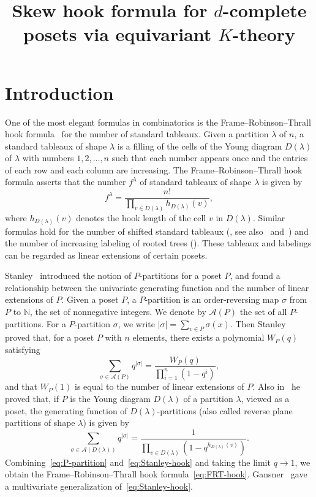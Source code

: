 \documentclass[ALCO,ThmDefs,Unicode,epreuves]{cedram}
\author{\firstname{Hiroshi} \lastname{Naruse}} %
\author{\firstname{Soichi} \lastname{Okada}} %
\title[Skew hook formula for $d$-complete posets via equivariant $K$-theory]{Skew hook formula for $d$-complete posets via equivariant $K$-theory}
\newcommand\Nat{\mathbb{N}}
\newcommand\AP{\mathcal{A}}
\begin{document}
\maketitle

\section{%
Introduction
}

One of the most elegant formulas in combinatorics is the Frame--Robinson--Thrall hook formula~\cite[Theorem~1]{FRT} for the number of standard tableaux.
Given a partition $\lambda$ of $n$, 
a standard tableaux of shape $\lambda$ is a filling of the cells of 
the Young diagram $D(\lambda)$ of $\lambda$ with numbers $1, 2, \dots, n$ 
such that each number appears once and the entries of each row and each column are increasing.
The Frame--Robinson--Thrall hook formula asserts that the number $f^\lambda$ of 
standard tableaux of shape $\lambda$ is given by
\begin{equation}
\label{eq:FRT-hook}
f^\lambda
 =
\frac{ n! }
 { \prod_{v \in D(\lambda)} h_{D(\lambda)}(v) },
\end{equation}
where $h_{D(\lambda)}(v)$ denotes the hook length of the cell $v$ in $D(\lambda)$.
Similar formulas hold for the number of shifted standard tableaux 
(\cite[5.1.4, Exercise~21]{Knu}, see also~\cite[\S~40]{Schur} and~\cite[Theorem~1]{T}) 
and the number of increasing labeling of rooted trees (\cite[5.1.4, Exercise~20]{Knu}).
These tableaux and labelings can be regarded as linear extensions of certain posets.

Stanley~\cite{Stan1} introduced the notion of $P$-partitions for a poset $P$, 
and found a relationship between the univariate generating function 
and the number of linear extensions of $P$.
Given a poset $P$, a $P$-partition is an order-reversing map $\sigma$ from $P$ to $\Nat$, 
the set of nonnegative integers.
We denote by $\AP(P)$ the set of all $P$-partitions.
For a $P$-partition $\sigma$, we write $|\sigma| = \sum_{v \in P} \sigma(x)$.
Then Stanley~\cite[Corollaries~5.3 and~5.4]{Stan1} proved that, for a poset $P$ with $n$ elements, 
there exists a polynomial $W_P(q)$ satisfying
\begin{equation}
\label{eq:P-partition}
\sum_{\sigma \in \AP(P)} q^{|\sigma|}
 =
\frac{ W_P(q) }
 { \prod_{i=1}^n (1 - q^i) },
\end{equation}
and that $W_P(1)$ is equal to the number of linear extensions of $P$.
Also in~\cite[Proposition~18.3]{Stan2} he proved that, 
if $P$ is the Young diagram $D(\lambda)$ of a partition $\lambda$, viewed as a poset, 
the generating function of $D(\lambda)$-partitions (also called reverse plane partitions of shape $\lambda$) 
is given by
\begin{equation}
\label{eq:Stanley-hook}
\sum_{\sigma \in \AP(D(\lambda))} q^{|\sigma|}
 =
\frac{ 1 }
 { \prod_{v \in D(\lambda)} (1 - q^{h_{D(\lambda)}(v)}) }.
\end{equation}
Combining~\eqref{eq:P-partition} and~\eqref{eq:Stanley-hook} and taking the limit $q \to 1$, 
we obtain the Frame--Robinson--Thrall hook formula~\eqref{eq:FRT-hook}.
Gansner~\cite[Theorem~5.1]{G} gave a multivariate generalization of~\eqref{eq:Stanley-hook}.
\end{document}

